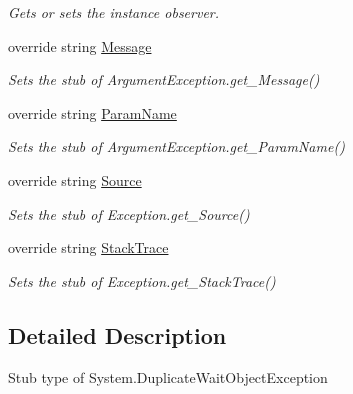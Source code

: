 \begin{DoxyCompactItemize}
\begin{DoxyCompactList}\small\item\em Gets or sets the instance observer.\end{DoxyCompactList}\item 
override string \hyperlink{class_system_1_1_fakes_1_1_stub_duplicate_wait_object_exception_a11271dea6203eaaac76b059ff5495c41}{Message}
\begin{DoxyCompactList}\small\item\em Sets the stub of Argument\-Exception.\-get\-\_\-\-Message()\end{DoxyCompactList}\item 
override string \hyperlink{class_system_1_1_fakes_1_1_stub_duplicate_wait_object_exception_a690033cf8a2978dd62f583a144547a70}{Param\-Name}
\begin{DoxyCompactList}\small\item\em Sets the stub of Argument\-Exception.\-get\-\_\-\-Param\-Name()\end{DoxyCompactList}\item 
override string \hyperlink{class_system_1_1_fakes_1_1_stub_duplicate_wait_object_exception_af3020aa0560985e0bae5f55da5e9101d}{Source}
\begin{DoxyCompactList}\small\item\em Sets the stub of Exception.\-get\-\_\-\-Source()\end{DoxyCompactList}\item 
override string \hyperlink{class_system_1_1_fakes_1_1_stub_duplicate_wait_object_exception_abc327a1aa772589f13fa76a13f80d037}{Stack\-Trace}
\begin{DoxyCompactList}\small\item\em Sets the stub of Exception.\-get\-\_\-\-Stack\-Trace()\end{DoxyCompactList}\end{DoxyCompactItemize}


\subsection{Detailed Description}
Stub type of System.\-Duplicate\-Wait\-Object\-Exception



